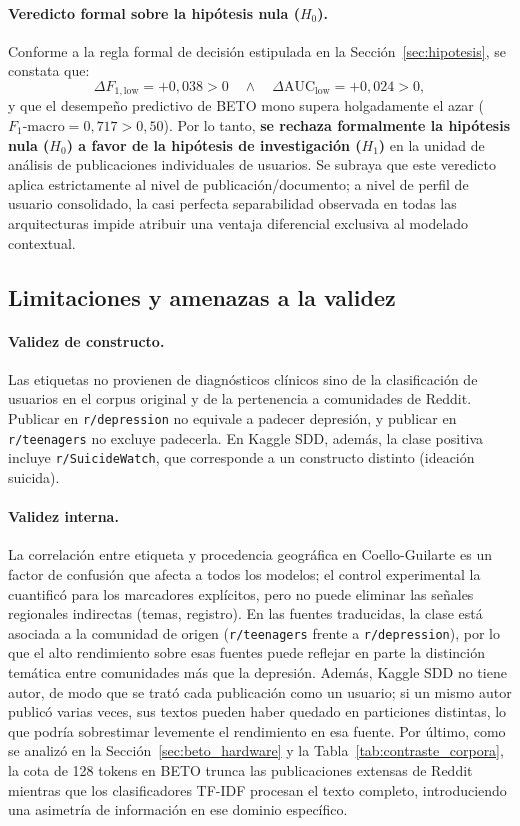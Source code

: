 \documentclass[12pt,a4paper]{article}
\begin{document}
\paragraph{Veredicto formal sobre la hipótesis nula ($H_0$).}
Conforme a la regla formal de decisión estipulada en la Sección~\ref{sec:hipotesis}, se constata que:
\begin{equation}
    \Delta F_{1,\text{low}} = +0{,}038 > 0 \quad \land \quad \Delta\text{AUC}_{\text{low}} = +0{,}024 > 0,
\end{equation}
y que el desempeño predictivo de BETO mono supera holgadamente el azar ($F_1\text{-macro} = 0{,}717 > 0{,}50$). Por lo tanto, \textbf{se rechaza formalmente la hipótesis nula ($H_0$) a favor de la hipótesis de investigación ($H_1$)} en la unidad de análisis de publicaciones individuales de usuarios. Se subraya que este veredicto aplica estrictamente al nivel de publicación/documento; a nivel de perfil de usuario consolidado, la casi perfecta separabilidad observada en todas las arquitecturas impide atribuir una ventaja diferencial exclusiva al modelado contextual.

\subsection{Limitaciones y amenazas a la validez}
\label{sec:limitaciones}
\paragraph{Validez de constructo.} Las etiquetas no provienen de diagnósticos clínicos sino de la clasificación de usuarios en el corpus original y de la pertenencia a comunidades de Reddit. Publicar en \texttt{r/depression} no equivale a padecer depresión, y publicar en \texttt{r/teenagers} no excluye padecerla. En Kaggle SDD, además, la clase positiva incluye \texttt{r/SuicideWatch}, que corresponde a un constructo distinto (ideación suicida).

\paragraph{Validez interna.} La correlación entre etiqueta y procedencia geográfica en Coello-Guilarte es un factor de confusión que afecta a todos los modelos; el control experimental la cuantificó para los marcadores explícitos, pero no puede eliminar las señales regionales indirectas (temas, registro). En las fuentes traducidas, la clase está asociada a la comunidad de origen (\texttt{r/teenagers} frente a \texttt{r/depression}), por lo que el alto rendimiento sobre esas fuentes puede reflejar en parte la distinción temática entre comunidades más que la depresión. Además, Kaggle SDD no tiene autor, de modo que se trató cada publicación como un usuario; si un mismo autor publicó varias veces, sus textos pueden haber quedado en particiones distintas, lo que podría sobrestimar levemente el rendimiento en esa fuente. Por último, como se analizó en la Sección~\ref{sec:beto_hardware} y la Tabla~\ref{tab:contraste_corpora}, la cota de 128 tokens en BETO trunca las publicaciones extensas de Reddit mientras que los clasificadores TF-IDF procesan el texto completo, introduciendo una asimetría de información en ese dominio específico.
\end{document}
